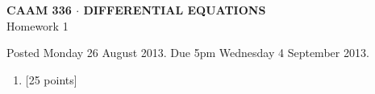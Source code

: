 \documentclass[10pt]{article}
\begin{document}
\vspace*{-5em}
\begin{center}
\large \textsf{\textbf{CAAM 336 $\cdot$ DIFFERENTIAL EQUATIONS}\\[0.5em]
Homework 1 }
\end{center}

Posted Monday 26 August 2013.  Due 5pm Wednesday 4 September 2013.

\begin{enumerate}\addtocounter{enumi}{0}
\item {[25 points]}  
\end{enumerate}
\end{document}
